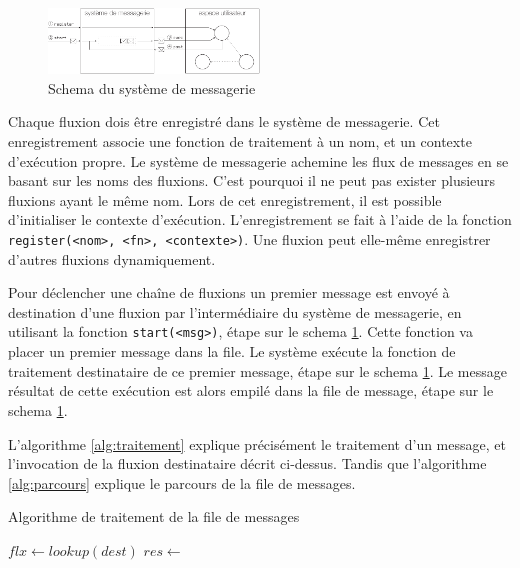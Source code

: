 \begin{figure}[h!]
  \includegraphics[width=0.5\textwidth]{schema-message.pdf}
  \caption{Schema du système de messagerie}
  \label{fig:messagerie}
\end{figure}

Chaque fluxion dois être enregistré dans le système de messagerie.
Cet enregistrement associe une fonction de traitement à un nom, et un contexte d'exécution propre.
Le système de messagerie achemine les flux de messages en se basant sur les noms des fluxions.
C'est pourquoi il ne peut pas exister plusieurs fluxions ayant le même nom.
Lors de cet enregistrement, il est possible d'initialiser le contexte d'exécution.
L'enregistrement se fait à l'aide de la fonction \texttt{register(<nom>, <fn>, <contexte>)}.
Une fluxion peut elle-même enregistrer d'autres fluxions dynamiquement.

Pour déclencher une chaîne de fluxions un premier message est envoyé à destination d'une fluxion par l'intermédiaire du système de messagerie, en utilisant la fonction \texttt{start(<msg>)}, étape  sur le schema \ref{fig:messagerie}.
Cette fonction va placer un premier message dans la file.
Le système exécute la fonction de traitement destinataire de ce premier message, étape  sur le schema \ref{fig:messagerie}.
Le message résultat de cette exécution est alors empilé dans la file de message, étape  sur le schema \ref{fig:messagerie}.

L'algorithme \ref{alg:traitement} explique précisément le traitement d'un message, et l'invocation de la fluxion destinataire décrit ci-dessus.
Tandis que l'algorithme \ref{alg:parcours} explique le parcours de la file de messages.

\begin{algorithm}
\caption{Algorithme de traitement de la file de messages}
\label{alg:traitement}
\begin{algorithmic}
\State $flx \gets lookup(dest)$
\State $res \gets$  
\State {} 
\EndFor
\EndFunction
\end{algorithmic}
\end{algorithm}

